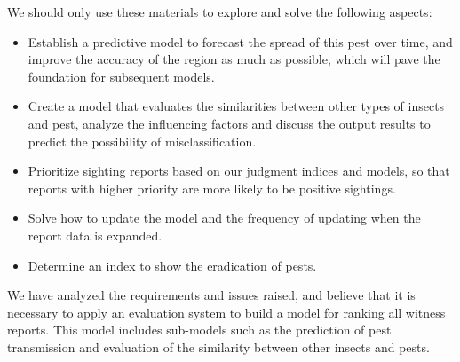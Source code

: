 We should only use these materials to explore and solve the following aspects:
\begin{itemize}%
    \item Establish a predictive model to forecast the spread of this pest over time, and improve the accuracy of the region as much as possible, which will pave the foundation for subsequent models.
    \item Create a model that evaluates the similarities between other types of insects and pest, analyze the influencing factors and discuss the output results to predict the possibility of misclassification.
    \item Prioritize sighting reports based on our judgment indices and models, so that reports with higher priority are more likely to be positive sightings.
    \item Solve how to update the model and the frequency of updating when the report data is expanded.
    \item Determine an index to show the eradication of pests.
\end{itemize}

We have analyzed the requirements and issues raised, and believe that it is necessary to apply an evaluation system to build a model for ranking all witness reports. This model includes sub-models such as the prediction of pest transmission and evaluation of the similarity between other insects and pests.

